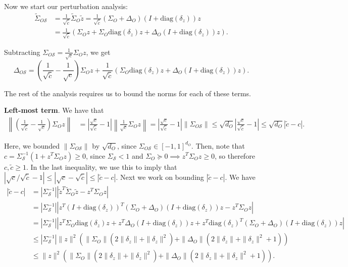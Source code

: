 \documentclass[letterpaper]{article}
\begin{document}
\begin{appendix}
Now we start our perturbation analysis:
\begin{align*}
	\tilde{\Sigma}_{O\mathcal{S}}
	&=
	\frac{1}{\sqrt{\tilde{c}}} \tilde{\Sigma}_O \tilde{z}
	=
	\frac{1}{\sqrt{\tilde{c}}} (\Sigma_O + \Delta_O)(I + \text{diag}(\delta_z))z \\
	&=
	\frac{1}{\sqrt{\tilde{c}}} \left(\Sigma_Oz + \Sigma_O\text{diag}(\delta_z)z + \Delta_O(I+\text{diag}(\delta_z))z \right).
\end{align*}

Subtracting $\Sigma_{O\mathcal{S}} = \frac{1}{\sqrt{c}} \Sigma_O z$, we get
\begin{equation}
	\Delta_{O\mathcal{S}}
	=
	\left(\frac{1}{\sqrt{\tilde{c}}}-\frac{1}{\sqrt{c}} \right) \Sigma_O z
	+ \frac{1}{\sqrt{\tilde{c}}} \left( \Sigma_O\text{diag}(\delta_z)z
	+ \Delta_O(I+\text{diag}(\delta_z))z \right).
	\label{eq:maindmu}
\end{equation}

The rest of the analysis requires us to bound the norms for each of these terms. 

{\bf Left-most term}. We have that
\begin{align*}
	\left\|\left( \frac{1}{\sqrt{\tilde{c}}} - \frac{1}{\sqrt{c}} \right)\Sigma_Oz \right\|
	&=
	\left| \frac{\sqrt{c}}{\sqrt{\tilde{c}}} -1 \right| \left\| \frac{1}{\sqrt{c}} \Sigma_Oz\right\|
	= 
	\left| \frac{\sqrt{c}}{\sqrt{\tilde{c}}} -1\right| \|\Sigma_{O\mathcal{S}}\|
	\leq
	\sqrt{d_O} \left| \frac{\sqrt{c}}{\sqrt{\tilde{c}}} -1 \right | \leq
	\sqrt{d_O} |\tilde{c} - c|.
\end{align*}

Here, we bounded $\|\Sigma_{O\mathcal{S}}\|$ by $\sqrt{d_O}$, since $\Sigma_{O\mathcal{S}} \in [-1,1]^{d_O}$. 
Then, note that $c = \Sigma_\mathcal{S}^{-1} (1 + z^T\Sigma_O z) \geq 0$, since $\Sigma_\mathcal{S} < 1$ and $\Sigma_O \succeq 0 \implies z^T\Sigma_O z \geq 0$, so therefore $c, \tilde{c} \geq 1$.
In the last inequality, we use this to imply that $|\sqrt{c}/\sqrt{\tilde{c}}-1| \leq |\sqrt{c}-\sqrt{\tilde{c}}| \leq |\tilde{c} - c|$. 
Next we work on bounding $|\tilde{c} - c|$. We have
\begin{align*}
	|\tilde{c}-c|
	&=
	|\Sigma_\mathcal{S}^{-1}||\tilde{z}^T\tilde{\Sigma}_O\tilde{z} - z^T\Sigma_Oz| \\
	&=
	|\Sigma_\mathcal{S}^{-1}||z^T (I+\text{diag}(\delta_z))^T(\Sigma_O + \Delta_O)(I+\text{diag}(\delta_z))z - z^T\Sigma_Oz|\\
	&=
	|\Sigma_\mathcal{S}^{-1}||z^T\Sigma_O\text{diag}(\delta_z)z + z^T\Delta_O(I+\text{diag}(\delta_z))z + z^T \text{diag}(\delta_z)^T (\Sigma_O+\Delta_O) (I+\text{diag}(\delta_z)) z | \\
	&\leq
	|\Sigma_\mathcal{S}^{-1}|\|z\|^2 \left( 
		\|\Sigma_O\| \left( 2\|\delta_z\| + \|\delta_z\|^2 \right)
		+ \|\Delta_O\| \left( 2\|\delta_z\| + \|\delta_z\|^2 + 1\right)
	\right)\\
	&\leq
	\|z\|^2 \left( 
		\|\Sigma_O\| \left( 2\|\delta_z\| + \|\delta_z\|^2 \right)
		+ \|\Delta_O\| \left( 2\|\delta_z\| + \|\delta_z\|^2 + 1\right)
	\right).
\end{align*}


\end{appendix}
\end{document}
